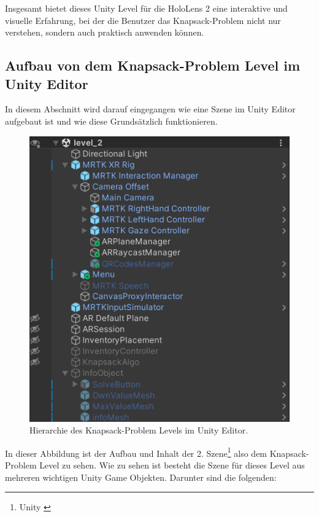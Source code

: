 Insgesamt bietet dieses Unity Level für die HoloLens 2 eine interaktive und visuelle Erfahrung,
bei der die Benutzer das Knapsack-Problem nicht nur verstehen, sondern auch praktisch anwenden können.

\subsection{Aufbau von dem Knapsack-Problem Level im Unity Editor}
In diesem Abschnitt wird darauf eingegangen wie eine Szene im Unity Editor aufgebaut ist und wie diese
Grundsätzlich funktionieren. \\

\begin{figure}[h]
    \centering
    \includegraphics[scale=0.8]{images/Level2Hirarchy}
    \caption{Hierarchie des Knapsack-Problem Levels im Unity Editor.}
    \label{fig:level2_hierarchy}
\end{figure}

In dieser Abbildung ist der Aufbau und Inhalt der 2. Szene\footnote{Unity \cite{Scene}} also dem Knapsack-Problem Level
zu sehen. Wie zu sehen ist besteht die Szene für dieses Level aus mehreren wichtigen Unity Game Objekten. Darunter
sind die folgenden:

